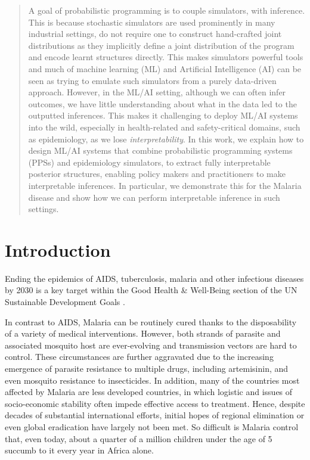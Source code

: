 \documentclass{article}
\begin{document}
\printAffiliationsAndNotice{\icmlEqualContribution} %

\begin{abstract}

A goal of probabilistic programming is to couple simulators, with inference. This is 
because stochastic simulators are used prominently in many industrial settings,
do not require one to construct hand-crafted joint distributions as they implicitly 
define a joint distribution of the program and encode learnt structures 
directly. This makes simulators powerful tools and much of machine learning (ML) and 
Artificial Intelligence (AI)
can be seen as trying to emulate such simulators from a purely data-driven approach.
However, in the 
ML/AI setting, although we can often infer outcomes, we have little understanding about what 
in the data led to the outputted inferences. 
This makes it challenging to deploy ML/AI systems into the wild, especially in health-related and safety-critical domains, such
as epidemiology, as we lose \emph{interpretability}. 
In this work, we explain how to design ML/AI systems that combine
probabilistic programming systems (PPSs) and epidemiology simulators, to extract
fully interpretable posterior structures, enabling policy makers 
and practitioners to make interpretable inferences. 
In particular, we demonstrate this for the Malaria disease and show how we can 
perform interpretable inference in such settings.
\end{abstract}

\section{Introduction}
Ending the epidemics of AIDS, tuberculosis, malaria and other infectious diseases by 2030 is a key target within the Good Health \& Well-Being section of the UN Sustainable Development Goals \cite{refugees_2030_nodate}\cite{un_sustainable_2018}. 

In contrast to AIDS, Malaria can be routinely cured thanks to the disposability of a variety of medical interventions. However, both strands of parasite and associated mosquito host are ever-evolving and transmission vectors are hard to control. These circumstances are further aggravated due to the increasing emergence of parasite resistance to multiple drugs, including artemisinin, and even mosquito resistance to insecticides. In addition, many of the countries most affected by Malaria are less developed countries, in which logistic and issues of socio-economic stability often impede effective access to treatment.  Hence, despite decades of substantial international efforts, initial hopes of regional elimination or even global eradication have largely not been met. So difficult is Malaria control that, even today, about a quarter of a million children under the age of 5 succumb to it every year in Africa alone\cite{un_sustainable_2018}. 
\end{document}
